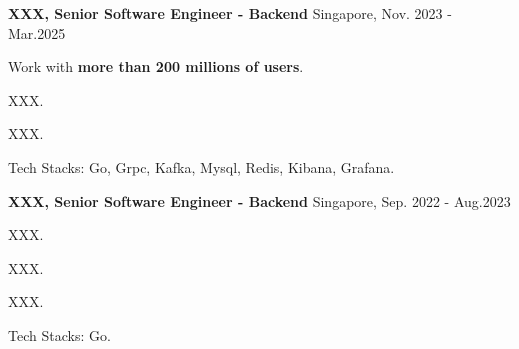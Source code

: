 \begin{cventries} %
  \cvsimpleentry
    {\textbf{XXX, Senior Software Engineer - Backend}} %
    {Singapore, Nov. 2023 - Mar.2025} %
    {
      \begin{cvitems} %
        \item {Work with \textbf{more than 200 millions of users}.}
        \item {XXX.}
        \item {XXX.}
        \item {Tech Stacks: Go, Grpc, Kafka, Mysql, Redis, Kibana, Grafana.}
      \end{cvitems}
    }
  \cvsimpleentry
    {\textbf{XXX, Senior Software Engineer - Backend}} %
    {Singapore, Sep. 2022 - Aug.2023} %
    {
      \begin{cvitems} %
        \item {XXX.}
        \item {XXX.}
        \item {XXX.}
        \item {Tech Stacks: Go.}
      \end{cvitems}
    }


\end{cventries}
